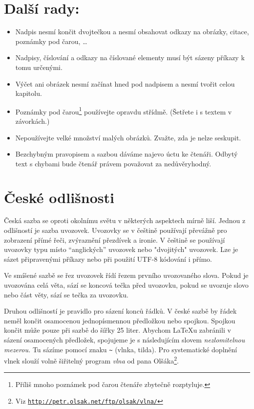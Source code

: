 \documentclass[a4paper,10pt,twocolumn]{article}
\begin{document}
\section{Další rady:}\label{Další rady:}
\begin{itemize}
\item Nadpis nesmí končit dvojtečkou a nesmí obsahovat odkazy na obrázky, citace, poznámky pod čarou, \ldots
\\

\item Nadpisy, číslování a odkazy na číslované elementy musí být sázeny příkazy k tomu určenými.

\item Výčet ani obrázek nesmí začínat hned pod nadpisem a nesmí tvořit celou kapitolu.

\item Poznámky pod čarou\footnote{Příliš mnoho poznámek pod čarou čtenáře zbytečně rozptyluje.} používejte opravdu střídmě. (Šetřete i s textem v závorkách.)

\item Nepoužívejte velké množství malých obrázků. Zvažte, zda je nelze seskupit.

\item Bezchybným pravopisem a sazbou dáváme najevo úctu ke čtenáři. Odbytý text s chybami bude čtenář právem považovat za nedůvěryhodný.
\end{itemize}
\section{České odlišnosti}
Česká sazba se oproti okolnímu světu v některých aspektech mírně liší. Jednou z odlišností je sazba uvozovek. Uvozovky se v češtině používají převážně pro zobrazení přímé řeči, zvýraznění přezdívek a ironie. V češtině se používají uvozovky typu  místo ``anglických'' uvozovek nebo "dvojitých" uvozovek. Lze je sázet připravenými příkazy nebo při použití UTF-8 kódování i přímo.

Ve smíšené sazbě se řez uvozovek řídí řezem prvního uvozovaného slova. Pokud je uvozována celá věta, sází se koncová tečka před uvozovku, pokud se uvozuje slovo nebo část věty, sází se tečka za uvozovku.

Druhou odlišností je pravidlo pro sázení konců řádků. V české sazbě by řádek neměl končit osamocenou jednopísmennou předložkou nebo spojkou. Spojkou  končit může pouze při sazbě do šířky 25 liter. Abychom \LaTeX u zabránili v sázení osamocených předložek, spojujeme je s následujícím slovem \textit{nezlomitelnou mezerou.} Tu sázíme pomocí znaku \verb|~| (vlnka, tilda). Pro systematické doplnění vlnek slouží volně šiřitelný program \textit{vlna} od pana Olšáka\footnote{Viz \href{http://petr.olsak.net/ftp/olsak/vlna/}{\nolinkurl{http://petr.olsak.net/ftp/olsak/vlna/}}}.
\end{document}
